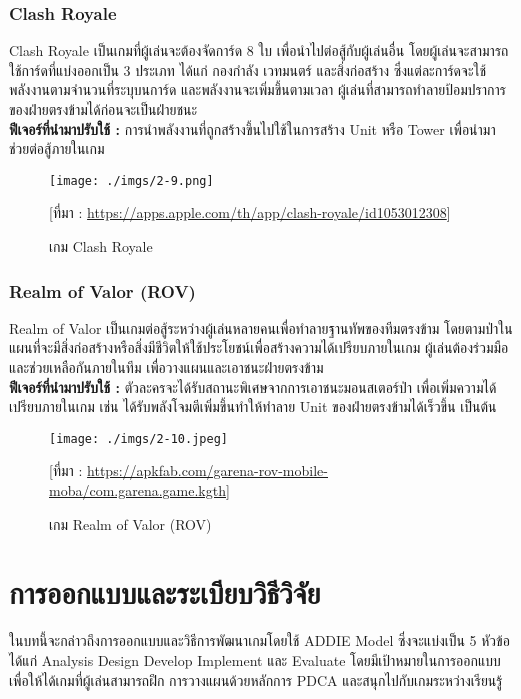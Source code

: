 \documentclass[12pt,oneside,openright,a4paper]{cpe-thai-project}
\begin{document}
\subsection{Clash Royale}
Clash Royale เป็นเกมที่ผู้เล่นจะต้องจัดการ์ด 8 ใบ เพื่อนำไปต่อสู้กับผู้เล่นอื่น 
โดยผู้เล่นจะสามารถใช้การ์ดที่แบ่งออกเป็น 3 ประเภท ได้แก่ กองกำลัง เวทมนตร์ และสิ่งก่อสร้าง 
ซึ่งแต่ละการ์ดจะใช้พลังงานตามจำนวนที่ระบุบนการ์ด และพลังงานจะเพิ่มขึ้นตามเวลา 
ผู้เล่นที่สามารถทำลายป้อมปราการของฝ่ายตรงข้ามได้ก่อนจะเป็นฝ่ายชนะ\\
\textbf{ฟีเจอร์ที่นำมาปรับใช้ : } การนำพลังงานที่ถูกสร้างขึ้นไปใช้ในการสร้าง 
Unit หรือ Tower เพื่อนำมาช่วยต่อสู้ภายในเกม
\begin{figure}[H]\centering
  \texttt{[image: ./imgs/2-9.png]}
  \caption{เกม Clash Royale}\label{fig:2-9}
  \small [ที่มา : \url{https://apps.apple.com/th/app/clash-royale/id1053012308}]
\end{figure}

\pagebreak
\subsection{Realm of Valor (ROV)}
Realm of Valor เป็นเกมต่อสู้ระหว่างผู้เล่นหลายคนเพื่อทำลายฐานทัพของทีมตรงข้าม 
โดยตามป่าในแผนที่จะมีสิ่งก่อสร้างหรือสิ่งมีชีวิตให้ใช้ประโยชน์เพื่อสร้างความได้เปรียบภายในเกม 
ผู้เล่นต้องร่วมมือและช่วยเหลือกันภายในทีม เพื่อวางแผนและเอาชนะฝ่ายตรงข้าม\\
\textbf{ฟีเจอร์ที่นำมาปรับใช้ : } ตัวละครจะได้รับสถานะพิเศษจากการเอาชนะมอนสเตอร์ป่า 
เพื่อเพิ่มความได้เปรียบภายในเกม เช่น ได้รับพลังโจมตีเพิ่มขึ้นทำให้ทำลาย Unit ของฝ่ายตรงข้ามได้เร็วขึ้น เป็นต้น
\begin{figure}[H]\centering
  \texttt{[image: ./imgs/2-10.jpeg]}
  \caption{เกม Realm of Valor (ROV)}\label{fig:2-10}
  \small [ที่มา : \url{https://apkfab.com/garena-rov-mobile-moba/com.garena.game.kgth}]
\end{figure}


\chapter{การออกแบบและระเบียบวิธีวิจัย}

ในบทนี้จะกล่าวถึงการออกแบบและวิธีการพัฒนาเกมโดยใช้ ADDIE Model 
ซึ่งจะแบ่งเป็น 5 หัวข้อ ได้แก่ Analysis Design Develop Implement 
และ Evaluate โดยมีเป้าหมายในการออกแบบเพื่อให้ได้เกมที่ผู้เล่นสามารถฝึก
การวางแผนด้วยหลักการ PDCA และสนุกไปกับเกมระหว่างเรียนรู้
\end{document}
